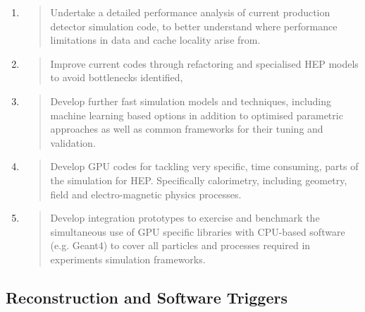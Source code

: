 \documentclass[11pt,a4paper]{article}
\begin{document}
\begin{enumerate}
\def\labelenumi{\arabic{enumi}.}
\item
  \begin{quote}
  Undertake a detailed performance analysis of current production
  detector simulation code, to better understand where performance
  limitations in data and cache locality arise from.
  \end{quote}
\item
  \begin{quote}
  Improve current codes through refactoring and specialised HEP models
  to avoid bottlenecks identified,
  \end{quote}
\item
  \begin{quote}
  Develop further fast simulation models and techniques, including
  machine learning based options in addition to optimised parametric
  approaches as well as common frameworks for their tuning and
  validation.
  \end{quote}
\item
  \begin{quote}
  Develop GPU codes for tackling very specific, time consuming, parts of
  the simulation for HEP. Specifically calorimetry, including geometry,
  field and electro-magnetic physics processes.
  \end{quote}
\item
  \begin{quote}
  Develop integration prototypes to exercise and benchmark the
  simultaneous use of GPU specific libraries with CPU-based software
  (e.g. Geant4) to cover all particles and processes required in
  experiments simulation frameworks.
  \end{quote}
\end{enumerate}

\hypertarget{reconstruction-and-software-triggers-1}{%
\subsection{Reconstruction and Software
Triggers}\label{reconstruction-and-software-triggers-1}}
\end{document}
